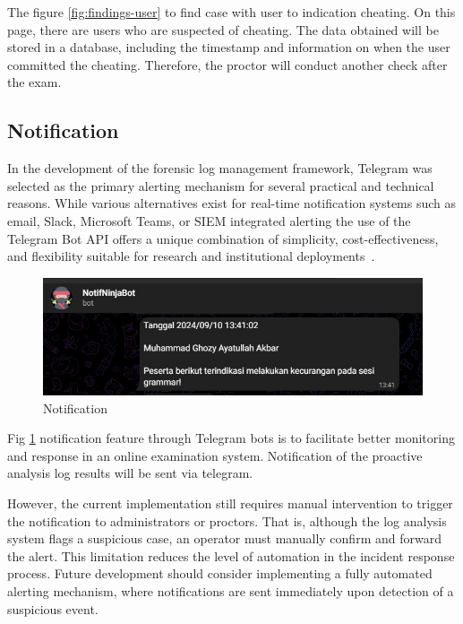 The figure \ref{fig:findings-user} to find case with user to indication cheating. On this page, there are users who are suspected of cheating. The data obtained will be stored in a database, including the timestamp and information on when the user committed the cheating. Therefore, the proctor will conduct another check after the exam.


\subsection{Notification}
In the development of the forensic log management framework, Telegram was selected as the primary alerting mechanism for several practical and technical reasons. While various alternatives exist for real-time notification systems such as email, Slack, Microsoft Teams, or SIEM integrated alerting the use of the Telegram Bot API offers a unique combination of simplicity, cost-effectiveness, and flexibility suitable for research and institutional deployments~\cite{wang2023telegramalert}.

\begin{figure}[H] 
	\centering
	\includegraphics[width=14cm]{figure/log-notification.jpeg}
	\caption{Notification}
	\label{fig:telegram-notification}
\end{figure}

Fig \ref{fig:telegram-notification} notification feature through Telegram bots is to facilitate better monitoring and response in an online examination system. Notification of the proactive analysis log results will be sent via telegram. 

However, the current implementation still requires manual intervention to trigger the notification to administrators or proctors. That is, although the log analysis system flags a suspicious case, an operator must manually confirm and forward the alert. This limitation reduces the level of automation in the incident response process. Future development should consider implementing a fully automated alerting mechanism, where notifications are sent immediately upon detection of a suspicious event.
